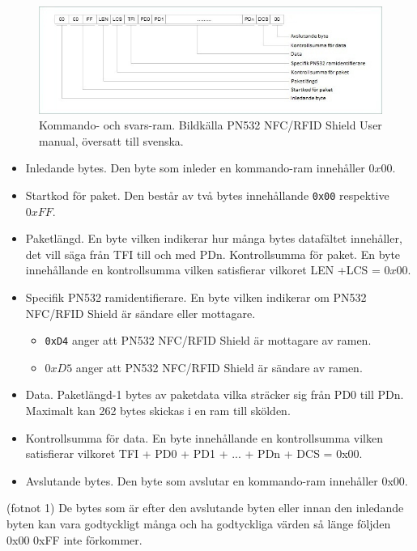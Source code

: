 \documentclass[11pt]{article}
\begin{document}
\begin{figure}[H]
\centering
\includegraphics[scale=0.8]{PN532_shield_ram.jpg}
\caption{Kommando- och svars-ram. Bildkälla PN532 NFC/RFID Shield User manual, översatt till svenska.}
\label{fig:PN532_shield_ram}
\end{figure}

\begin{itemize}
\item Inledande bytes. Den byte som inleder en kommando-ram innehåller $0x00$.
\item Startkod för paket. Den består av två bytes innehållande \texttt{0x00} respektive $0xFF$.
\item Paketlängd. En byte vilken indikerar hur många bytes datafältet innehåller, det vill säga från TFI till och med PDn.
Kontrollsumma för paket. En byte innehållande en kontrollsumma vilken satisfierar vilkoret LEN +LCS = $0x00$.
\item Specifik PN532 ramidentifierare. En byte vilken indikerar om PN532 NFC/RFID Shield är sändare eller mottagare.
\begin{itemize}
\item \texttt{0xD4} anger att PN532 NFC/RFID Shield är mottagare av ramen.
\item $0xD5$ anger att PN532 NFC/RFID Shield är sändare av ramen.
\end{itemize}
\item Data. Paketlängd-1 bytes av paketdata vilka sträcker sig från PD0 till PDn. Maximalt kan 262 bytes skickas i en ram till skölden.
\item Kontrollsumma för data. En byte innehållande en kontrollsumma vilken satisfierar vilkoret TFI + PD0 + PD1 + ... + PDn + DCS = 0x00.
\item Avslutande bytes. Den byte som avslutar en kommando-ram innehåller 0x00.
\end{itemize}

(fotnot 1) De bytes som är efter den avslutande byten eller innan den inledande byten kan vara godtyckligt många och ha godtyckliga värden så länge följden 0x00 0xFF inte förkommer.
\end{document}
